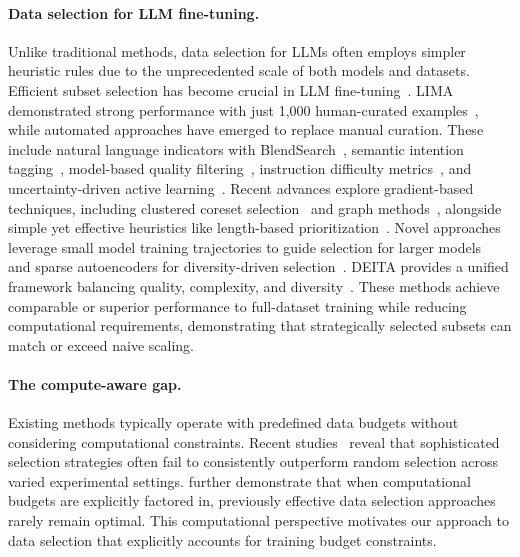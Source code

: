 \paragraph{Data selection for LLM fine-tuning.}
Unlike traditional methods, data selection for LLMs often employs simpler heuristic rules due to the unprecedented scale of both models and datasets.
Efficient subset selection has become crucial in LLM fine-tuning~\cite{ds_albalak2022survey,Marone2023DataPR,Oren2019DistributionallyRL,Rae2021ScalingLM}. LIMA demonstrated strong performance with just 1,000 human-curated examples~\cite{ds_ift_Zhou2023LIMALI}, while automated approaches have emerged to replace manual curation. These include natural language indicators with BlendSearch~\cite{ds_ift_Cao2023InstructionMH}, semantic intention tagging~\citep{ds_ift_Lu2023InsTagIT}, model-based quality filtering~\citep{ds_ift_chen2023alpagasus,ds_ift_lian2023slimorca}, instruction difficulty metrics~\citep{ds_ift_Li2023FromQT}, and uncertainty-driven active learning~\citep{ds_ift_Kung2023ActiveIT}. Recent advances explore gradient-based techniques, including clustered coreset selection~\citep{ds_ift_cluster_Zhang2024TAGCOSTG} and graph methods~\citep{ds_ift_Zhao2025BeyondSA}, alongside simple yet effective heuristics like length-based prioritization~\citep{ds_ift_Zhao2024LongIM}. Novel approaches leverage small model training trajectories to guide selection for larger models~\citep{ds_ift_Yang2024SmallToLargeS} and sparse autoencoders for diversity-driven selection~\citep{ds_ift_Yang2025DiversitydrivenDS}. DEITA provides a unified framework balancing quality, complexity, and diversity~\citep{ds_ift_Liu2023WhatMG}. These methods achieve comparable or superior performance to full-dataset training while reducing computational requirements, demonstrating that strategically selected subsets can match or exceed naive scaling.

\paragraph{The compute-aware gap.}
Existing methods typically operate with predefined data budgets without considering computational constraints. Recent studies~\citep{ds_ift_Diddee2024ChasingRI,ds_ift_Shen2024RethinkingDS,ds_ift_Xia2024RethinkingDS} reveal that sophisticated selection strategies often fail to consistently outperform random selection across varied experimental settings. \cite{Yin2024ComputeConstrainedDS} further demonstrate that when computational budgets are explicitly factored in, previously effective data selection approaches rarely remain optimal. This computational perspective motivates our approach to data selection that explicitly accounts for training budget constraints.

